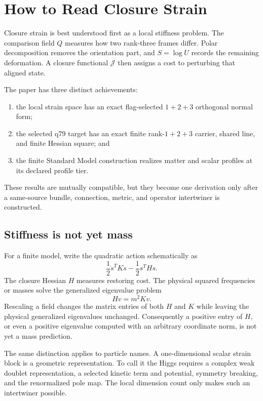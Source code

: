 \documentclass[11pt]{article}
\begin{document}
\tableofcontents

\section{How to Read Closure Strain}

Closure strain is best understood first as a local stiffness problem.  The
comparison field $Q$ measures how two rank-three frames differ.  Polar
decomposition removes the orientation part, and $S=\log U$ records the
remaining deformation.  A closure functional $\mathcal J$ then assigns a cost
to perturbing that aligned state.

The paper has three distinct achievements:
\begin{enumerate}
\item the local strain space has an exact flag-selected $1+2+3$ orthogonal
normal form;
\item the selected q79 target has an exact finite rank-$1+2+3$ carrier,
shared line, and finite Hessian square; and
\item the finite Standard Model construction realizes matter and scalar
profiles at its declared profile tier.
\end{enumerate}
These results are mutually compatible, but they become one derivation only
after a same-source bundle, connection, metric, and operator intertwiner is
constructed.

\subsection{Stiffness is not yet mass}

For a finite model, write the quadratic action schematically as
\[
 \frac12\dot s^{T}K\dot s-\frac12s^{T}Hs.
\]
The closure Hessian $H$ measures restoring cost.  The physical squared
frequencies or masses solve the generalized eigenvalue problem
\[
 Hv=m^2Kv.
\]
Rescaling a field changes the matrix entries of both $H$ and $K$ while leaving
the physical generalized eigenvalues unchanged.  Consequently a positive
entry of $H$, or even a positive eigenvalue computed with an arbitrary
coordinate norm, is not yet a mass prediction.

The same distinction applies to particle names.  A one-dimensional scalar
strain block is a geometric representation.  To call it the Higgs requires a
complex weak doublet representation, a selected kinetic term and potential,
symmetry breaking, and the renormalized pole map.  The local dimension count
only makes such an intertwiner possible.
\end{document}
